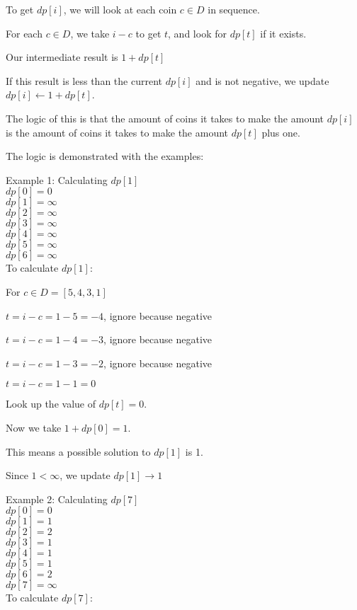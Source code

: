 To get $dp[i]$, we will look at each coin $c \in D$ in sequence.

For each $c \in D$, we take $i - c$ to get $t$, and look for $dp[t]$ if it exists.

Our intermediate result is $1 + dp[t]$

If this result is less than the current $dp[i]$ and is not negative, we update $dp[i] \leftarrow 1 + dp[t]$.

The logic of this is that the amount of coins it takes to make the amount $dp[i]$ is the amount of coins it takes to make the amount $dp[t]$ plus one.

The logic is demonstrated with the examples:

Example 1: Calculating $dp[1]$\\
$dp[0]=0$\\
$dp[1]=\infty$\\
$dp[2]=\infty$\\
$dp[3]=\infty$\\
$dp[4]=\infty$\\
$dp[5]=\infty$\\
$dp[6]=\infty$\\

To calculate $dp[1]$:

For $c \in D = [5,4,3,1]$

$t = i-c = 1-5 = -4$, ignore because negative

$t = i-c = 1-4 = -3$, ignore because negative

$t = i-c = 1-3 = -2$, ignore because negative

$t = i-c = 1-1 = 0$

Look up the value of $dp[t] = 0$.

Now we take $1 + dp[0] = 1$.

This means a possible solution to $dp[1]$ is 1.

Since $1 < \infty$, we update $dp[1] \rightarrow 1$

Example 2: Calculating $dp[7]$\\
$dp[0]=0$\\
$dp[1]=1$\\
$dp[2]=2$\\
$dp[3]=1$\\
$dp[4]=1$\\
$dp[5]=1$\\
$dp[6]=2$\\
$dp[7]=\infty$\\

To calculate $dp[7]$:


